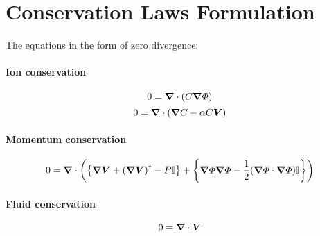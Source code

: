 \section{Conservation Laws Formulation}
The equations in the form of zero divergence:

\paragraph{Ion conservation}
\[ 0 = \boldsymbol{\nabla} \cdot \left( C \boldsymbol{\nabla} \varPhi \right) \]
\[ 0 = \boldsymbol{\nabla} \cdot \left( \boldsymbol{\nabla} C - \alpha C \boldsymbol{V} \right) \]

\paragraph{Momentum conservation}
\[ 0 = \boldsymbol{\nabla} \cdot \left(
\left\{ \boldsymbol{\nabla} \boldsymbol{V} + (\boldsymbol{\nabla} \boldsymbol{V})^\dagger - P\mathbb{I} \right\} +
\left\{ \boldsymbol{\nabla} \varPhi \boldsymbol{\nabla} \varPhi - \frac{1}{2} (\boldsymbol{\nabla} \varPhi \cdot \boldsymbol{\nabla} \varPhi) \mathbb{I} \right\} \right) \]

\paragraph{Fluid conservation}
\[ 0 = \boldsymbol{\nabla} \cdot \boldsymbol{V} \]

